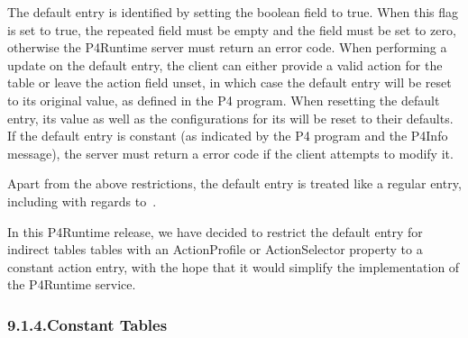 \documentclass[11pt]{article}
\begin{document}
{%
The default entry is identified by setting the  boolean field
to true. When this flag is set to true, the repeated  field must be empty
and the  field must be set to zero, otherwise the P4Runtime server
must return an  error code. When performing a  update
on the default entry, the client can either provide a valid action for the table
or leave the action field unset, in which case the default entry will be reset
to its original value, as defined in the P4 program. When resetting the default
entry, its  value as well as the configurations for its
 will be reset to their defaults. If
the default entry is constant (as indicated by the P4 program and the P4Info
message), the server must return a  error code if the client
attempts to modify it.%

Apart from the above restrictions, the default entry is treated like a regular
entry, including with regards to~.%

In this P4Runtime release, we have decided to restrict the default entry for
indirect tables \textemdash{} tables with an ActionProfile or ActionSelector
 property \textemdash{} to a constant  action entry, with the hope
that it would simplify the implementation of the P4Runtime service.%

\subsubsection{9.1.4.\hspace*{0.5em}Constant Tables}\label{sec-constant-tables}%

}
\end{document}
